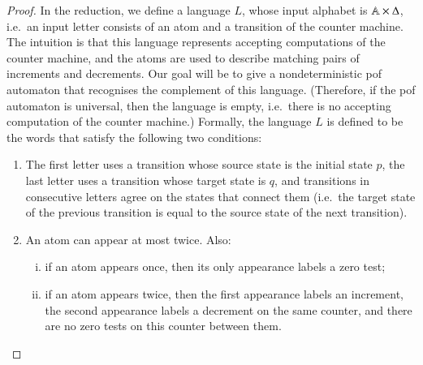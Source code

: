 \begin{proof}
In the reduction,
we define a language $L$, whose input alphabet is  $\mathbb A \times \Delta$, i.e.~an input letter consists of an atom and a transition of the counter machine.  The intuition is that this language represents accepting computations of the counter machine, and the atoms are used to describe matching pairs of increments and decrements. Our goal  will be to give a nondeterministic pof automaton that recognises the complement of this language. (Therefore, if the pof automaton is universal, then the language is empty, i.e.~there is no accepting computation of the counter machine.) Formally, the language $L$ is defined to be the words that satisfy the following two conditions:
\begin{enumerate}
    \item\label{list:undecidable-universality-states} The first letter uses a transition whose source state is  the initial state $p$, the last letter uses a transition whose target state is  $q$, and  transitions in consecutive letters agree on the  states that connect them (i.e.~the target state of the previous transition is equal to the source state of the next transition).
    \item\label{list:undecidable-universality-counters} An atom can appear at most twice. Also: 
    \begin{enumerate}[(i)]
        \item if an atom appears once, then its only appearance labels a zero test;
        \item if an atom appears twice, then the first appearance labels an increment, the second appearance labels a decrement on the same counter, and there are no zero tests on this counter between them. 
    \end{enumerate}
\end{enumerate}


\end{proof}
